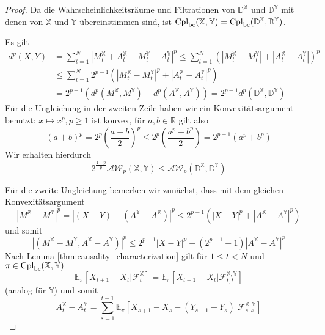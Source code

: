 \begin{proof}
    Da die Wahrscheinlichkeitsräume und Filtrationen von $\mathbb{D}^\mathbb{X}$ und $\mathbb{D}^\mathbb{Y}$ mit denen von $\mathbb{X}$ und $\mathbb{Y}$ übereinstimmen sind, ist $\operatorname{Cpl}_{\operatorname{bc}}(\mathbb{X,Y}) = \operatorname{Cpl}_{\operatorname{bc}}(\mathbb{D}^\mathbb{X}, \mathbb{D}^\mathbb{Y})$.

    Es gilt 
    \begin{align*}
        d^p(X,Y) &= \sum_{t=1}^N \left|M_t^\mathbb{X} + A_t^\mathbb{X} - M_t^\mathbb{Y} - A_t^\mathbb{Y}\right|^p \leq \sum_{t=1}^N \left(|M_t^\mathbb{X} - M_t^\mathbb{Y}| + |A_t^\mathbb{X} - A_t^\mathbb{Y}| \right)^p \\
        &\leq \sum_{t=1}^N 2^{p-1} \left( |M_t^\mathbb{X} - M_t^\mathbb{Y}|^p + |A_t^\mathbb{X} - A_t^\mathbb{Y}|^p\right) \\
        &= 2^{p-1}(d^p(M^\mathbb{X}, M^\mathbb{Y}) + d^p(A^\mathbb{X}, A^\mathbb{Y})) = 2^{p-1}d^p(\mathbb{D}^\mathbb{X}, \mathbb{D}^\mathbb{Y})
    \end{align*}
    Für die Ungleichung in der zweiten Zeile haben wir ein Konvexitätsargument benutzt: $x\mapsto x^p, p\geq 1$ ist konvex, für $a,b\in \mathbb{R}$ gilt also
    \begin{equation}\label{eq:convexity_argument1}
        (a+b)^p= 2^p(\frac{a+b}{2})^p \leq 2^p(\frac{a^p+b^p}{2}) = 2^{p-1}(a^p+b^p)
    \end{equation}
    Wir erhalten hierdurch
    $$2^{\frac{1-p}{p}}\mathcal{AW}_p(\mathbb{X,Y}) \leq \mathcal{AW}_p(\mathbb{D}^\mathbb{X}, \mathbb{D}^\mathbb{Y})$$
    
    Für die zweite Ungleichung bemerken wir zunächst, dass mit dem gleichen Konvexitätsargument 
    $$|M^\mathbb{X} - M^\mathbb{Y}|^p = |(X-Y) + (A^\mathbb{Y} - A^\mathbb{X})|^p \leq 2^{p-1}(|X-Y|^p + |A^\mathbb{X} - A^\mathbb{Y}|^p)$$
    und somit 
    \begin{equation}\label{eq:doob_ineq} 
        |(M^\mathbb{X}-M^\mathbb{Y}, A^\mathbb{X} - A^\mathbb{Y})|^p \leq 2^{p-1}|X-Y|^p + (2^{p-1}+1)|A^\mathbb{X}-A^\mathbb{Y}|^p
    \end{equation}
    Nach Lemma \ref{thm:causality_characterization} gilt für $1\leq t<N$ und $\pi \in \operatorname{Cpl}_{\operatorname{bc}}(\mathbb{X,Y})$ 
    $$\mathbb{E}_\pi\left[ X_{t+1} - X_{t} \vert \mathcal{F}_t^\mathbb{X}\right] = \mathbb{E}_\pi\left[X_{t+1}-X_{t} \vert \mathcal{F}_{t,t}^\mathbb{X,Y}\right]$$
    (analog für $\mathbb{Y}$) und somit
    $$A_t^\mathbb{X} - A_t^\mathbb{Y} = \sum_{s=1}^{t-1} \mathbb{E}_\pi\left[ X_{s+1} - X_{s} - (Y_{s+1} - Y_{s}) \vert \mathcal{F}_{s,s}^\mathbb{X,Y} \right]$$ 


\end{proof}
